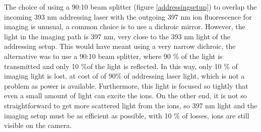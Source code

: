 The choice of using a 90:10 beam splitter (figure \ref{addressingsetup}) to overlap the incoming 393 nm addressing laser with the outgoing 397 nm ion fluorescence for imaging is unusual, a common choice is to use a dichroic mirror. However, the light in the imaging path is 397 nm, very close to the 393 nm light of the addressing setup. This would have meant using a very narrow dichroic, the alternative was to use a 90:10 beam splitter, where 90 \% of the light is transmitted and only 10 \%of the light is reflected. In this way, only 10 \% of imaging light is lost, at cost of of 90\% of addressing laser light, which is not a problem as power is available. Furthermore, this light is focused so tightly that even a small amount of light can excite the ions. On the other end, it is not so straightforward to get more scattered light from the ions, so 397 nm light and the imaging setup must be as efficient as possible, with 10 \% of losses, ions are still visible on the camera.

